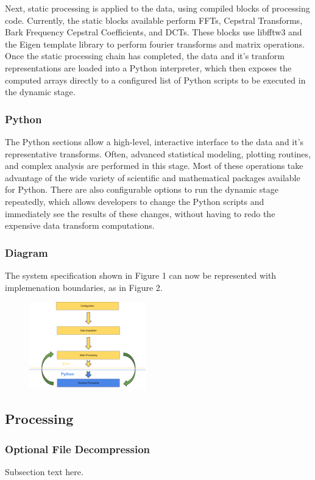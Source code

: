\documentclass[journal]{IEEEtran}
\begin{document}
Next, static processing is applied to the data, using compiled blocks of processing code. Currently, the static blocks available perform FFTs, 
Cepstral Transforms, Bark Frequency Cepstral Coefficients, and DCTs. These blocks use libfftw3 and the Eigen template library to perform 
fourier transforms and matrix operations. Once the static processing chain has completed, the data and it's tranform representations are 
loaded into a Python interpreter, which then exposes the computed arrays directly to a configured list of Python scripts to be executed in the dynamic
stage.

\subsubsection{Python}
The Python sections allow a high-level, interactive interface to the data and it's representative transforms. Often, advanced statistical modeling, 
plotting routines, and complex analysis are performed in this stage. Most of these operations take advantage of the wide variety of scientific 
and mathematical packages available for Python. There are also configurable options to run the dynamic stage repeatedly, which allows developers to change the Python scripts and immediately see the results of these changes, without having to redo the expensive data transform computations.

\subsubsection{Diagram}
The system specification shown in Figure 1 can now be represented with implemenation boundaries, as in Figure 2.
\begin{figure}[h!]
\centering
  \includegraphics[width=0.45\textwidth]{fig2.png}
\end{figure}

\subsection{Processing}
\subsubsection{Optional File Decompression}
Subsection text here.
\end{document}
